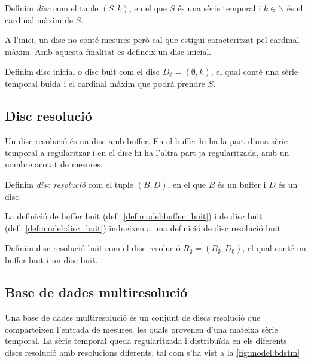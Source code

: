 \begin{definition}[Disc]
  Definim \emph{disc} com el tuple $(S,k)$, en el que $S$
  és una sèrie temporal i $k\in\mathbb{N}$ és el cardinal màxim de $S$.
\end{definition}

A l'inici, un disc no conté mesures però cal que estigui caracteritzat pel cardinal màxim. Amb aquesta finalitat es defineix un disc inicial.

\begin{definition}\label{def:model:disc_buit}
  Definim disc inicial o disc buit com el disc $D_{\emptyset} =
  (\emptyset,k)$, el qual conté una sèrie temporal buida i el cardinal
  màxim que podrà prendre $S$.
\end{definition}




\subsection{Disc resolució}\label{sec:model:disc_multiresolucio}

Un disc resolució és un disc amb buffer. En el buffer hi ha la part d'una sèrie temporal a regularitzar i en el disc hi ha l'altra part ja regularitzada, amb un nombre acotat de mesures. 

\begin{definition}
  Definim \emph{disc resolució} com el tuple $(B,D)$, en el que $B$
  és un buffer i $D$ és un disc.
\end{definition}
 
La definició de buffer buit (def.~\ref{def:model:buffer_buit}) i de disc buit (def.~\ref{def:model:disc_buit}) indueixen a una definició de disc resolució buit. 

\begin{definition}\label{def:model:disc_resolucio_buit}
  Definim disc resolució buit com el disc resolució $R_{\emptyset}
  = (B_{\emptyset},D_{\emptyset})$, el qual conté un buffer buit i un
  disc buit.
\end{definition}




\subsection{Base de dades multiresolució}\label{sec:model:bdstm}

Una base de dades multiresolució és un conjunt de discs resolució que comparteixen l'entrada de mesures, les quals provenen d'una mateixa sèrie temporal. La sèrie temporal queda regularitzada i distribuïda  en els diferents discs resolució amb resolucions diferents, tal com s'ha vist a la \autoref{fig:model:bdstm}


